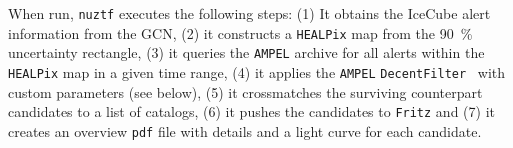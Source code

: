When run, \texttt{nuztf} executes the following steps: (1) It obtains the IceCube alert information from the GCN, (2) it constructs a \texttt{HEALPix} map from the \SI{90}{\percent} uncertainty rectangle, (3) it queries the \texttt{AMPEL} archive for all alerts within the \texttt{HEALPix} map in a given time range, (4) it applies the \texttt{AMPEL} \texttt{DecentFilter}~\cite{Nordin2019} with custom parameters (see below), (5) it crossmatches the surviving counterpart candidates to a list of catalogs, (6) it pushes the candidates to \texttt{Fritz} and (7) it creates an overview \texttt{pdf} file with details and a light curve for each candidate.

